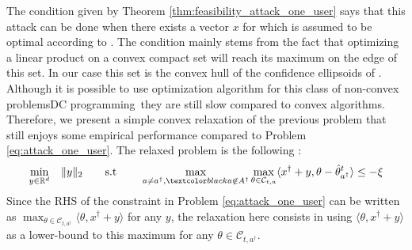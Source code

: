 The condition given by Theorem \ref{thm:feasibility_attack_one_user} says that this attack can be done when there exists a vector $x$ for which  is assumed to be optimal according to \linucb. The condition mainly stems from the fact that optimizing a linear product on a convex compact set will reach its maximum on the edge of this set. In our case this set is the convex hull of the confidence ellipsoids of \linucb. Although it is possible to use  optimization algorithm for this class of non-convex problems\textemdash \eg DC programming~\cite{tuy1995dc}\textemdash they are still slow compared to convex algorithms. Therefore, we present a simple convex relaxation of the previous problem  that still enjoys some empirical performance compared to Problem \eqref{eq:attack_one_user}.  The relaxed problem is the following :
\begin{equation}\label{eq:relaxed_attack_one_user}
\begin{aligned}
\min_{y\in \mathbb{R}^{d}} \quad & \| y \|_2 \quad \quad \text{s.t }\quad &  \max_{a\neq a^{\dagger}, \changee{a\not\in A^{\dagger}}} \max_{\theta \in \mathcal{C}_{t,a}} \langle x^{\dagger} + y, \theta - \hat{\theta}_{a^{\dagger}}^t \rangle \leq -\xi
\end{aligned}
\end{equation}
Since the RHS of the constraint in Problem \eqref{eq:attack_one_user} can be written as $\max_{\theta\in\mathcal{C}_{t,a^{\dagger}}} \langle \theta, x^{\dagger} + y \rangle$ for any $y$, the relaxation here consists in using $\langle\theta, x^{\dagger}+y\rangle$ as a lower-bound to this maximum for any $\theta\in\mathcal{C}_{t,a^{\dagger}}$. 


